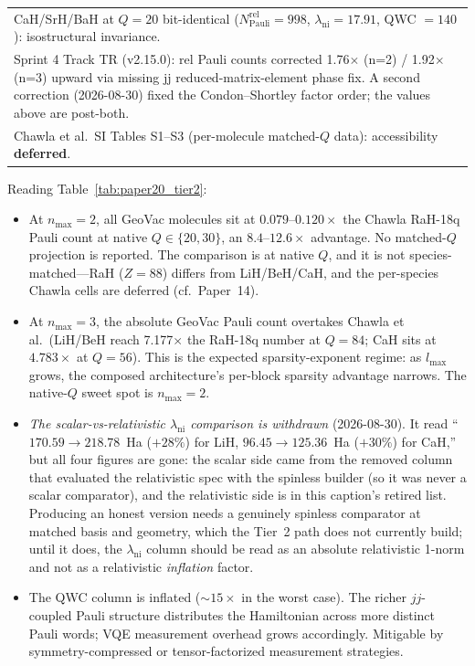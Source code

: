 \documentclass[twocolumn,pra,amsmath,amssymb,superscriptaddress]{revtex4-2}
\newcommand{\gvq}[2]{#2}
\begin{document}
\begin{table}[h]
\begin{ruledtabular}
\begin{tabular}{ccccccc}
\multicolumn{7}{l}{\footnotesize CaH/SrH/BaH at $Q=20$ bit-identical ($N_{\mathrm{Pauli}}^{\mathrm{rel}} = \gvq{cah_rel_n2_pauli}{998}$, $\lambda_{\mathrm{ni}} = 17.91$, QWC $= 140$): isostructural invariance.} \\
\multicolumn{7}{l}{\footnotesize Sprint 4 Track TR (v2.15.0): rel Pauli counts corrected 1.76$\times$ (n=2) / 1.92$\times$ (n=3) upward via missing jj reduced-matrix-element phase fix.  A second correction (2026-08-30) fixed the Condon--Shortley factor order; the values above are post-both.} \\
\multicolumn{7}{l}{\footnotesize Chawla et al.\ SI Tables S1--S3 (per-molecule matched-$Q$ data): accessibility \textbf{deferred}.} \\
\end{tabular}
\end{ruledtabular}
\end{table}

Reading Table~\ref{tab:paper20_tier2}:

\begin{itemize}
  \item At $n_{\max}=2$, all GeoVac molecules sit at
    $0.079$--$0.120\times$ the Chawla RaH-18q Pauli count at native
    $Q \in \{20, 30\}$, an $8.4$--$12.6\times$ advantage.  No matched-$Q$
    projection is reported.  The comparison is at native $Q$, and it is not
    species-matched---RaH ($Z=88$) differs from LiH/BeH/CaH, and the
    per-species Chawla cells are deferred (cf.\ Paper~14).
  \item At $n_{\max}=3$, the absolute GeoVac Pauli count overtakes
    Chawla et al.\ (LiH/BeH reach 7.177$\times$ the RaH-18q
    number at $Q = 84$; CaH sits at $4.783\times$ at $Q = 56$). This
    is the expected sparsity-exponent regime: as $l_{\max}$ grows,
    the composed architecture's per-block sparsity advantage narrows.
    The native-$Q$ sweet spot is $n_{\max}=2$.
  \item \emph{The scalar-vs-relativistic $\lambda_{\mathrm{ni}}$
    comparison is withdrawn} (2026-08-30).  It read
    ``$170.59 \to 218.78$~Ha ($+28\%$) for LiH, $96.45 \to 125.36$~Ha
    ($+30\%$) for CaH,'' but all four figures are gone: the scalar side
    came from the removed column that evaluated the relativistic spec
    with the spinless builder (so it was never a scalar comparator), and
    the relativistic side is in this caption's retired list.  Producing
    an honest version needs a genuinely spinless comparator at matched
    basis and geometry, which the Tier~2 path does not currently build;
    until it does, the $\lambda_{\mathrm{ni}}$ column should be read as
    an absolute relativistic 1-norm and not as a relativistic
    \emph{inflation} factor.
  \item The QWC column is inflated ($\sim 15\times$ in the worst case).
    The richer $jj$-coupled Pauli structure distributes the
    Hamiltonian across more distinct Pauli words; VQE measurement
    overhead grows accordingly. Mitigable by symmetry-compressed
    or tensor-factorized measurement strategies.
\end{itemize}
\end{document}

